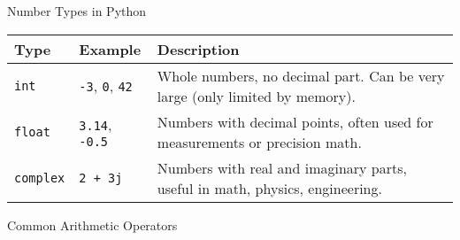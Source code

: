 \documentclass[
  letterpaper,
  DIV=11,
  numbers=noendperiod]{scrreprt}
\begin{document}
Number Types in Python

\begin{longtable}[]{@{}
  >{\raggedright\arraybackslash}p{}
  >{\raggedright\arraybackslash}p{}
  >{\raggedright\arraybackslash}p{}@{}}
\toprule\noalign{}
\begin{minipage}[b]{\linewidth}\raggedright
Type
\end{minipage} & \begin{minipage}[b]{\linewidth}\raggedright
Example
\end{minipage} & \begin{minipage}[b]{\linewidth}\raggedright
Description
\end{minipage} \\
\midrule\noalign{}
\endhead
\bottomrule\noalign{}
\endlastfoot
\texttt{int} & \texttt{-3}, \texttt{0}, \texttt{42} & Whole numbers, no
decimal part. Can be very large (only limited by memory). \\
\texttt{float} & \texttt{3.14}, \texttt{-0.5} & Numbers with decimal
points, often used for measurements or precision math. \\
\texttt{complex} & \texttt{2\ +\ 3j} & Numbers with real and imaginary
parts, useful in math, physics, engineering. \\
\end{longtable}

Common Arithmetic Operators
\end{document}
